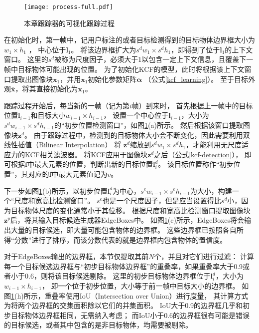 \begin{figure}[htb]
\centering
\texttt{[image: process-full.pdf]}
\caption{本章跟踪器的可视化跟踪过程}
\label{process}
\end{figure}

在初始化时，第一帧中，记用户标注的或者目标检测得到的目标物体边界框大小为$w_1\times h_1$ ，
中心位于$\mathbf{l}_1$。
将该边界框扩大为$s^dw_1\times s^dh_1$，即得到了位于$\mathbf{l}_1$的上下文窗口。
这里的$s^d$被称为尺度因子，必须大于$1$以包含一定上下文信息，且覆盖下一帧中目标物体可能出现的位置。
为了初始化KCF的模型，此时将根据该上下文窗口提取出图像块$\mathbf{x}_1$，并用$\mathbf{x}_1$初始化参数矩阵${\boldsymbol{\alpha}}$ （公式\ref{kcf_learning}）。
至于目标外观$\overline{\mathbf{x}}$，将其直接初始化为$\mathbf{x}_1$。

跟踪过程开始后，每当新的一帧（记为第$i$帧）到来时，
首先根据上一帧中的目标位置$\mathbf{l}_{i-1}$和目标大小$w_{i-1}\times h_{i-1}$，
设置一个中心位于$\mathbf{l}_{i-1}$，大小为$s^dw_{i-1}\times s^dh_{i-1}$的``初步位置检测窗口''，如图\ref{process}(a)所示。
然后根据该窗口提取图像块$\mathbf{z}^d$。
由于跟踪过程中，检测到的目标物体大小会不断变化，因此需要利用双线性插值（Bilinear Interpolation）
将 $\mathbf{z}^d$缩放到$s^dw_1\times s^dh_1$，才能利用无尺度适应力的KCF相关滤波器。
将KCF应用于图像块$\mathbf{z}^d$之后（公式\ref{kcf-detection}），
即可根据$\mathbf{f}$中最大元素的位置，判断出新的目标位置$\mathbf{l}^d_i$。
该目标位置称作``初步位置''，其对应的$\mathbf{f}$中最大元素值记为$v$。

下一步如图\ref{process}(b)所示，以初步位置$\mathbf{l}^d_i$为中心，$s^ew_{i-1}\times s^eh_{i-1}$为大小，构建一个``尺度和宽高比检测窗口''。
$s^e$也是一个尺度因子，但是应当设置得比$s^d$小，因为目标物体尺度的变化通常小于其位移。
根据尺度和宽高比检测窗口提取图像块$\mathbf{z}^p$后，将其输入目标候选生成器EdgeBoxes中。
如图\ref{process}(c)所示，EdgeBoxes将会输出大量的目标候选，即大量可能包含物体的边界框。
这些边界框已按照各自所得``分数''进行了排序，而该分数代表的就是边界框内包含物体的置信度。

对于EdgeBoxes输出的边界框，本节仅提取其前$N$个，并且对它们进行过滤：
计算每一个目标候选边界框与``初步目标物体边界框''的重叠率，如果重叠率大于0.9或者小于0.6，则将该目标候选剔除。
这里的初步目标物体边界框位于$\mathbf{l}^d_i$，大小为$w_{i-1}\times h_{i-1}$，
即一个位于初步位置，大小等于前一帧中目标大小的边界框。
如图\ref{process}(h)所示，重叠率使用IoU（Intersection over Union）进行度量，
其计算方式为将两个边界框的交集面积除以它们的并集面积。
IoU大于0.9的边界框几乎和初步目标物体边界框相同，无需纳入考虑；
而IoU小于0.6的边界框很有可能是错误的目标候选，或者其中包含的是非目标物体，均需要被剔除。

